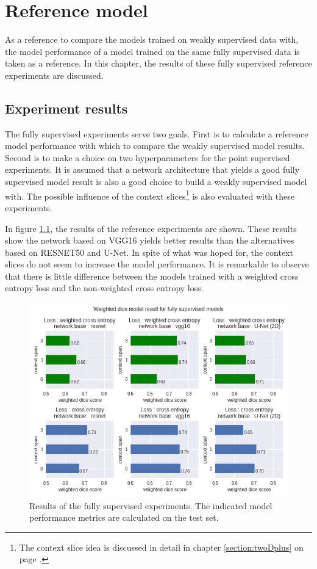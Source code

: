 \chapter{Reference model\label{sec:reference_model}}
\par{
    As a reference to compare the models trained on weakly supervised data with, the model performance of a model trained on the same fully supervised data is taken as a reference.
    In this chapter, the results of these fully supervised reference experiments are discussed.
}

\section{Experiment results}
\par{
    The fully supervised experiments serve two goals.
    First is to calculate a reference model performance with which to compare the weakly supervised model results.
    Second is to make a choice on two hyperparameters for the point supervised experiments.
    It is assumed that a network architecture that yields a good fully supervised model result is also a good choice to build a weakly supervised model with.
    The possible influence of the context slices\footnote{The context slice idea is discussed in detail in chapter \ref{section:twoDplus} on page \pageref{section:twoDplus}.} is also evaluated with these experiments.
}
\par{
    In figure \ref{fig:referenceExperiments}, the results of the reference experiments are shown.
    These results show the network based on VGG16 yields better results than the alternatives based on RESNET50 and U-Net.
    In spite of what was hoped for, the context slices do not seem to increase the model performance.
    It is remarkable to observe that there is little difference between the models trained with a weighted cross entropy loss and the non-weighted cross entropy loss.
}
\begin{figure}
    \centering
    \includegraphics[width=.95\textwidth]{images/FullySupervised.png}
    \caption{Results of the fully supervised experiments.
    The indicated model performance metrics are calculated on the test set.
    \label{fig:referenceExperiments}}
\end{figure}

